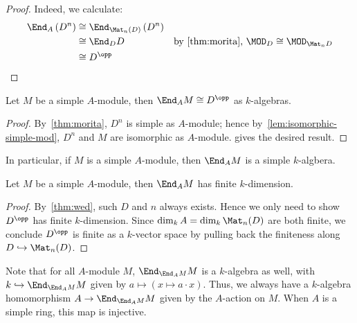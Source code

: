 \begin{proof}
  Indeed, we calculate:
  \[
    \begin{aligned}
      \End_{A}\left(D^{n}\right) &\cong \End_{\Mat_{n}(D)}\left(D^{n}\right) & \\
                                 &\cong \End_{D}D & \text{by~\cref{thm:morita},}~\MOD_{D}\cong\MOD_{\Mat_{n}D}\\
                                 &\cong D^{\opp}
    \end{aligned}
  \]
\end{proof}

\begin{lemma}\label{lem:end-simple-iso}
  Let $M$ be a simple $A$-module, then $\End_{A} M\cong D^{\opp}$ as
  $k$-algebras.
  \leanok
\end{lemma}
\begin{proof}
  By~\cref{thm:morita}, $D^{n}$ is simple as $A$-module; hence
  by~\cref{lem:isomorphic-simple-mod}, $D^{n}$ and $M$ are isomorphic as
  $A$-module.  gives the desired result.
\end{proof}

\begin{remark}
  In particular, if $M$ is a simple $A$-module, then $\End_{A}M$ is a simple
  $k$-algbera.
\end{remark}

\begin{lemma}
  Let $M$ be a simple $A$-module, then $\End_{A}M$ has finite $k$-dimension.
  \leanok
\end{lemma}
\begin{proof}
  By~\cref{thm:wed}, such $D$ and $n$ always exists. Hence we only need to show
  $D^{\opp}$ has finite $k$-dimension. Since $\dim_{k}A=\dim_{k}\Mat_{n}(D)$ are
  both finite, we conclude $D^{\opp}$ is finite as a $k$-vector space by pulling
  back the finiteness along $D \hookrightarrow \Mat_{n}(D)$.
\end{proof}

\begin{remark}
  Note that for all $A$-module $M$, $\End_{\End_{A}M}M$ is a $k$-algebra as
  well, with $k \hookrightarrow \End_{\End_{A}M}M$ given by
  $a \mapsto (x \mapsto a\cdot x)$. Thus, we always have a $k$-algebra
  homomorphism $A \to \End_{\End_{A}M}M$ given by the $A$-action on $M$. When
  $A$ is a simple ring, this map is injective.
\end{remark}

